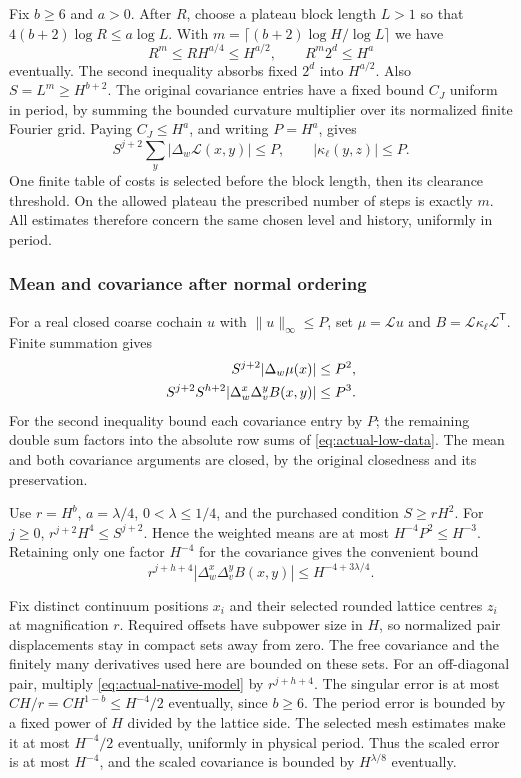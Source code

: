 Fix $b\ge6$ and $a>0$. After $R$, choose a plateau block length
$L>1$ so that $4(b+2)\log R\le a\log L$. With
$m=\lceil(b+2)\log H/\log L\rceil$ we have
\[
 R^m\le RH^{a/4}\le H^{a/2},\qquad R^m2^d\le H^a
\]
eventually. The second inequality absorbs fixed $2^d$ into
$H^{a/2}$. Also $S=L^m\ge H^{b+2}$.
The original covariance entries have a fixed bound $C_J$ uniform
in period, by summing the bounded curvature multiplier over its
normalized finite Fourier grid. Paying $C_J\le H^a$, and writing
$P=H^a$, gives
\begin{equation}\label{eq:actual-low-data}
 S^{j+2}\sum_y|\Delta_w\mathcal L(x,y)|\le P,
                  \qquad |\kappa_\ell(y,z)|\le P.
\end{equation}
One finite table of costs is selected before the block length,
then its clearance threshold. On the allowed plateau the prescribed
number of steps is exactly $m$. All estimates therefore concern
the same chosen level and history, uniformly in period.

\subsubsection{Mean and covariance after normal ordering}

For a real closed coarse cochain $u$ with $\|u\|_\infty\le P$,
set $\mu=\mathcal Lu$ and
$B=\mathcal L\kappa_\ell\mathcal L^{\mathsf T}$.
Finite summation gives
\begin{align}\label{eq:actual-low-moments}
 S^{j+2}|\Delta_w\mu(x)|&\le P^2,\\
 S^{j+2}S^{h+2}|\Delta_w^x\Delta_v^yB(x,y)|&\le P^3.
 \notag
\end{align}
For the second inequality bound each covariance entry by $P$;
the remaining double sum factors into the absolute row sums of
\eqref{eq:actual-low-data}. The mean and both covariance arguments
are closed, by the original closedness and its preservation.

Use $r=H^b$, $a=\lambda/4$, $0<\lambda\le1/4$, and the purchased
condition $S\ge rH^2$. For $j\ge0$,
$r^{j+2}H^4\le S^{j+2}$. Hence the weighted means are at most
$H^{-4}P^2\le H^{-3}$. Retaining only one factor $H^{-4}$ for
the covariance gives the convenient bound
\begin{equation}\label{eq:actual-low-error}
 r^{j+h+4}|\Delta_w^x\Delta_v^yB(x,y)|
                              \le H^{-4+3\lambda/4}.
\end{equation}

Fix distinct continuum positions $x_i$ and their selected rounded
lattice centres $z_i$ at magnification $r$. Required offsets have
subpower size in $H$, so normalized pair displacements stay in
compact sets away from zero. The free covariance and the finitely
many derivatives used here are bounded on these sets.
For an off-diagonal pair, multiply
\eqref{eq:actual-native-model} by $r^{j+h+4}$.
The singular error is at most $CH/r=CH^{1-b}\le H^{-4}/2$
eventually, since $b\ge6$. The period error is bounded by a fixed
power of $H$ divided by the lattice side. The selected mesh estimates
make it at most $H^{-4}/2$ eventually, uniformly in physical period.
Thus the scaled error is at most $H^{-4}$, and the scaled covariance
is bounded by $H^{\lambda/8}$ eventually.

